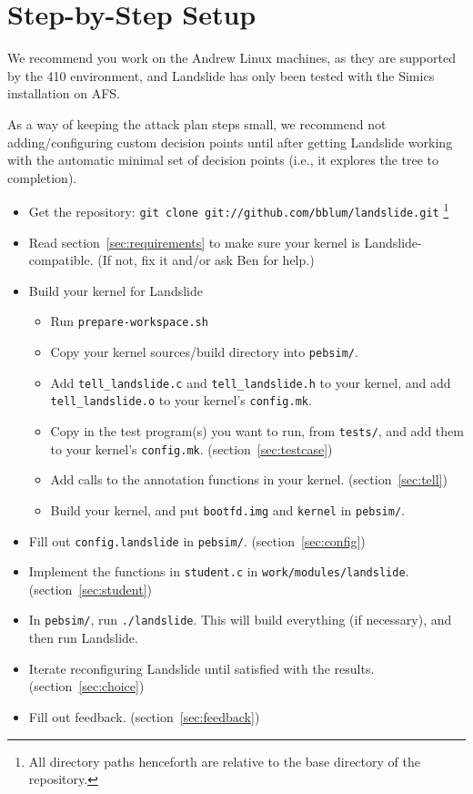 \documentclass{article}
\begin{document}
\newpage
\appendix
\section{Step-by-Step Setup}
\label{sec:stepbystep}

We recommend you work on the Andrew Linux machines, as they are supported by the 410 environment, and Landslide has only been tested with the Simics installation on AFS.

As a way of keeping the attack plan steps small, we recommend not adding/configuring custom decision points until after getting Landslide working with the automatic minimal set of decision points (i.e., it explores the tree to completion).

\begin{itemize}
	\item Get the repository: \texttt{git clone git://github.com/bblum/landslide.git}
		\footnote{All directory paths henceforth are relative to the base directory of the repository.}
	\item Read section~\ref{sec:requirements} to make sure your kernel is Landslide-compatible. (If not, fix it and/or ask Ben for help.)
	\item Build your kernel for Landslide
	\begin{itemize}
		\item Run \texttt{prepare-workspace.sh}
		\item Copy your kernel sources/build directory into \texttt{pebsim/}.
		\item Add \texttt{tell\_landslide.c} and \texttt{tell\_landslide.h} to your kernel, and add \texttt{tell\_landslide.o} to your kernel's \texttt{config.mk}.
		\item Copy in the test program(s) you want to run, from \texttt{tests/}, and add them to your kernel's \texttt{config.mk}. (section~\ref{sec:testcase})
		\item Add calls to the annotation functions in your kernel. (section~\ref{sec:tell})
		\item Build your kernel, and put \texttt{bootfd.img} and \texttt{kernel} in \texttt{pebsim/}.
	\end{itemize}
	\item Fill out \texttt{config.landslide} in \texttt{pebsim/}. (section~\ref{sec:config})
	\item Implement the functions in \texttt{student.c} in \texttt{work/modules/landslide}. (section~\ref{sec:student})
	\item In \texttt{pebsim/}, run \texttt{./landslide}. This will build everything (if necessary), and then run Landslide.
	\item Iterate reconfiguring Landslide until satisfied with the results. (section~\ref{sec:choice})
	\item Fill out feedback. (section~\ref{sec:feedback})
\end{itemize}
\end{document}
